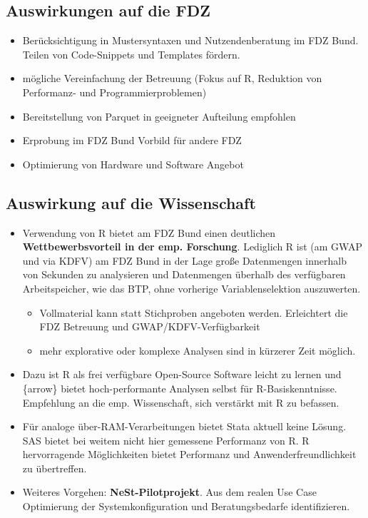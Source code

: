 \documentclass[
  german,
  10pt,
  twoside]{article}
\providecommand{\tightlist}{%
  \setlength{\itemsep}{0pt}\setlength{\parskip}{0pt}}
\begin{document}
\subsection{Auswirkungen auf die FDZ}\label{auswirkungen-auf-die-fdz}

\begin{itemize}
\tightlist
\item
  Berücksichtigung in Mustersyntaxen und Nutzendenberatung im FDZ Bund.
  Teilen von Code-Snippets und Templates fördern.
\item
  mögliche Vereinfachung der Betreuung (Fokus auf R, Reduktion von
  Performanz- und Programmierproblemen)
\item
  Bereitstellung von Parquet in geeigneter Aufteilung empfohlen
\item
  Erprobung im FDZ Bund Vorbild für andere FDZ
\item
  Optimierung von Hardware und Software Angebot
\end{itemize}

\subsection{Auswirkung auf die
Wissenschaft}\label{auswirkung-auf-die-wissenschaft}

\begin{itemize}
\tightlist
\item
  Verwendung von R bietet am FDZ Bund einen deutlichen
  \textbf{Wettbewerbsvorteil in der emp. Forschung}. Lediglich R ist (am
  GWAP und via KDFV) am FDZ Bund in der Lage große Datenmengen innerhalb
  von Sekunden zu analysieren und Datenmengen überhalb des verfügbaren
  Arbeitspeicher, wie das BTP, ohne vorherige Variablenselektion
  auszuwerten.

  \begin{itemize}
  \tightlist
  \item
    Vollmaterial kann statt Stichproben angeboten werden. Erleichtert
    die FDZ Betreuung und GWAP/KDFV-Verfügbarkeit
  \item
    mehr explorative oder komplexe Analysen sind in kürzerer Zeit
    möglich.
  \end{itemize}
\item
  Dazu ist R als frei verfügbare Open-Source Software leicht zu lernen
  und \{arrow\} bietet hoch-performante Analysen selbst für
  R-Basiskenntnisse. Empfehlung an die emp. Wissenschaft, sich verstärkt
  mit R zu befassen.
\item
  Für analoge über-RAM-Verarbeitungen bietet Stata aktuell keine Lösung.
  SAS bietet bei weitem nicht hier gemessene Performanz von R. R
  hervorragende Möglichkeiten bietet Performanz und
  Anwenderfreundlichkeit zu übertreffen.
\item
  Weiteres Vorgehen: \textbf{NeSt-Pilotprojekt}. Aus dem realen Use Case
  Optimierung der Systemkonfiguration und Beratungsbedarfe
  identifizieren.
\end{itemize}
\end{document}

